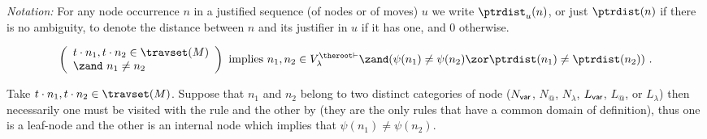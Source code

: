 \emph{Notation:} For any node occurrence $n$ in a justified sequence
(of nodes or of moves) $u$ we write $\ptrdist_u(n)$, or just
$\ptrdist(n)$ if there is no ambiguity, to denote the distance
between $n$ and its justifier in $u$ if it has one, and $0$
otherwise.

\begin{lemma}
\label{lem:varphiinjective:prelem}
\begin{equation*}
\left(
  \begin{array}{ll}
    t \cdot n_1, t \cdot n_2 \in \travset(M) \\
    \zand\ n_1 \neq n_2
  \end{array}
\right)
 \mbox{ implies } n_1,n_2 \in V^{\theroot\vdash}_{\lambda} \zand ( \psi(n_1) \neq \psi(n_2) \zor \ptrdist(n_1) \neq \ptrdist(n_2) ) \ .
 \end{equation*}
\end{lemma}
\proof Take $t \cdot n_1, t \cdot n_2 \in \travset(M)$. Suppose that
$n_1$ and $n_2$ belong to two distinct categories of node ($N_{\sf
var}$, $N_@$, $N_\lambda$, $L_{\sf var}$, $L_@$, or $L_\lambda$)
then necessarily one must be visited with the rule
 and the other by  (they are
the only rules that have a common domain of definition), thus one is
a leaf-node and the other is an internal node which implies that
$\psi(n_1) \neq \psi(n_2)$.

